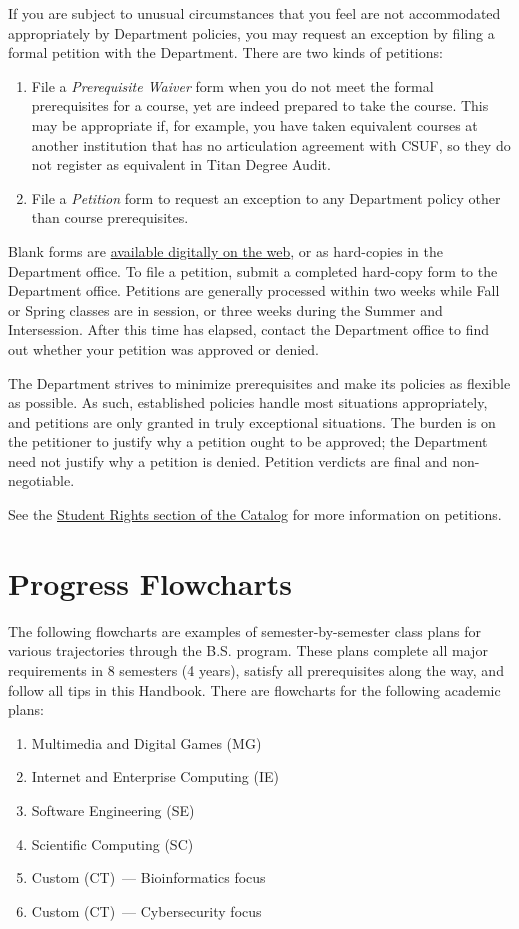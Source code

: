 \documentclass{book}
\newcommand{\CampusName}{CSUF}
\newcommand{\MgTrackName}{Multimedia and Digital Games (MG)}
\newcommand{\IeTrackName}{Internet and Enterprise Computing (IE)}
\newcommand{\SeTrackName}{Software Engineering (SE)}
\newcommand{\ScTrackName}{Scientific Computing (SC)}
\newcommand{\cttrackname}{Custom (CT)}
\newcommand{\CtBioTrackName}{\cttrackname~--- Bioinformatics focus}
\newcommand{\CtSecurityTrackName}{\cttrackname~--- Cybersecurity focus}
\begin{document}
If you are subject to unusual circumstances that you feel are not accommodated appropriately by Department policies, you may request an exception by filing a formal petition with the Department. There are two kinds of petitions:
\begin{enumerate}
\item File a \emph{Prerequisite Waiver} form when you do not meet the formal prerequisites for a course, yet are indeed prepared to take the course. This may be appropriate if, for example, you have taken equivalent courses at another institution that has no articulation agreement with \CampusName, so they do not register as equivalent in Titan Degree Audit.
\item File a \emph{Petition} form to request an exception to any Department policy other than course prerequisites.
\end{enumerate}

Blank forms are \href{http://fullerton.edu/ecs/cs/resources/formsDocuments.asp}{available digitally on the web}, or as hard-copies in the Department office. To file a petition, submit a completed hard-copy form to the Department office. Petitions are generally processed within two weeks while Fall or Spring classes are in session, or three weeks during the Summer and Intersession. After this time has elapsed, contact the Department office to find out whether your petition was approved or denied.

The Department strives to minimize prerequisites and make its policies as flexible as possible. As such, established policies handle most situations appropriately, and petitions are only granted in truly exceptional situations. The burden is on the petitioner to justify why a petition ought to be approved; the Department need not justify why a petition is denied. Petition verdicts are final and non-negotiable.

See the \href{http://catalog.fullerton.edu/content.php?catoid=2&navoid=115#Student_Rights}{Student Rights section of the Catalog} for more information on petitions.

\chapter{Progress Flowcharts}

The following flowcharts are examples of semester-by-semester class plans for various trajectories through the B.S. program. These plans complete all major requirements in 8 semesters (4 years), satisfy all prerequisites along the way, and follow all tips in this Handbook. There are flowcharts for the following academic plans:
\begin{enumerate}
\item \MgTrackName
\item \IeTrackName
\item \SeTrackName
\item \ScTrackName
\item \CtBioTrackName
\item \CtSecurityTrackName
\end{enumerate}
\end{document}
